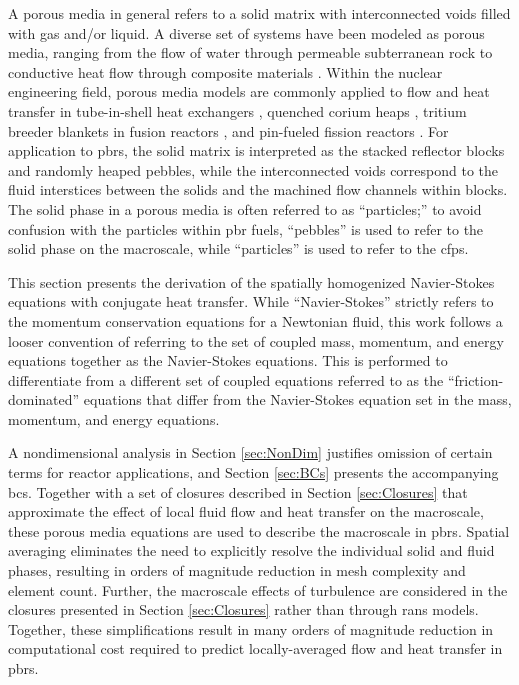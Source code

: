 A porous media in general refers to a solid matrix with interconnected voids filled with gas and/or liquid. A diverse set of systems have been modeled as porous media, ranging from the flow of water through permeable subterranean rock to conductive heat flow through composite materials \cite{diersch}. Within the nuclear engineering field, porous media models are commonly applied to flow and heat transfer in tube-in-shell heat exchangers \cite{ge_prhr}, quenched corium heaps \cite{magallon,raverdy}, tritium breeder blankets in fusion reactors \cite{xu_cfetr,zhang2016,guo2006}, and pin-fueled fission reactors \cite{zarifi}. For application to \glspl{pbr}, the solid matrix is interpreted as the stacked reflector blocks and randomly heaped pebbles, while the interconnected voids correspond to the fluid interstices between the solids and the machined flow channels within blocks. The solid phase in a porous media is often referred to as ``particles;'' to avoid confusion with the particles within \gls{pbr} fuels, ``pebbles'' is used to refer to the solid phase on the macroscale, while ``particles'' is used to refer to the \glspl{cfp}.

This section presents the derivation of the spatially homogenized Navier-Stokes equations with conjugate heat transfer. While ``Navier-Stokes'' strictly refers to the momentum conservation equations for a Newtonian fluid, this work follows a looser convention of referring to the set of coupled mass, momentum, and energy equations together as the Navier-Stokes equations. This is performed to differentiate from a different set of coupled equations referred to as the ``friction-dominated'' equations that differ from the Navier-Stokes equation set in the mass, momentum, and energy equations.

A nondimensional analysis in Section \ref{sec:NonDim} justifies omission of certain terms for reactor applications, and Section \ref{sec:BCs} presents the accompanying \glspl{bc}. Together with a set of closures described in Section \ref{sec:Closures} that approximate the effect of local fluid flow and heat transfer on the macroscale, these porous media equations are used to describe the macroscale in \glspl{pbr}. Spatial averaging eliminates the need to explicitly resolve the individual solid and fluid phases, resulting in orders of magnitude reduction in mesh complexity and element count. Further, the macroscale effects of turbulence are considered in the closures presented in Section \ref{sec:Closures} rather than through \gls{rans} models. Together, these simplifications result in many orders of magnitude reduction in computational cost required to predict locally-averaged flow and heat transfer in \glspl{pbr}.


